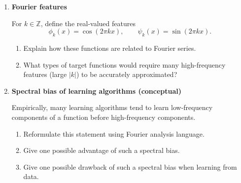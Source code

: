 \documentclass[11pt]{article}
\begin{document}
\begin{enumerate}
Consider the one-dimensional heat equation
\[
\partial_t u(t,x)=\partial_{xx}u(t,x), \qquad x\in\mathbb{R},\ t>0,
\]
with initial condition \(u(0,x)=f(x)\).

\begin{enumerate}
\item Apply the Fourier transform in the spatial variable \(x\) to the PDE and write the resulting ordinary differential equation for \(\hat u(t,\xi)\).
\item Solve this ODE for \(\hat u(t,\xi)\) in terms of \(\hat f(\xi)\).
\item Write the solution \(u(t,x)\) using the inverse Fourier transform.
\end{enumerate}

\bigskip
\item \textbf{Fourier features}

For \(k\in\mathbb{Z}\), define the real-valued features
\[
\phi_k(x)=\cos(2\pi kx), \qquad \psi_k(x)=\sin(2\pi kx).
\]

\begin{enumerate}
\item Explain how these functions are related to Fourier series.
\item What types of target functions would require many high-frequency features (large \(|k|\)) to be accurately approximated?
\end{enumerate}

\bigskip
\item \textbf{Spectral bias of learning algorithms (conceptual)}

Empirically, many learning algorithms tend to learn low-frequency components of a function before high-frequency components.

\begin{enumerate}
\item Reformulate this statement using Fourier analysis language.
\item Give one possible advantage of such a spectral bias.
\item Give one possible drawback of such a spectral bias when learning from data.
\end{enumerate}

\end{enumerate}
\end{document}
